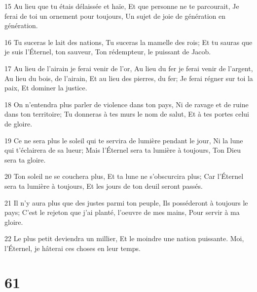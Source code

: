 \par 15 Au lieu que tu étais délaissée et haïe, Et que personne ne te parcourait, Je ferai de toi un ornement pour toujours, Un sujet de joie de génération en génération.
\par 16 Tu suceras le lait des nations, Tu suceras la mamelle des rois; Et tu sauras que je suis l'Éternel, ton sauveur, Ton rédempteur, le puissant de Jacob.
\par 17 Au lieu de l'airain je ferai venir de l'or, Au lieu du fer je ferai venir de l'argent, Au lieu du bois, de l'airain, Et au lieu des pierres, du fer; Je ferai régner sur toi la paix, Et dominer la justice.
\par 18 On n'entendra plus parler de violence dans ton pays, Ni de ravage et de ruine dans ton territoire; Tu donneras à tes murs le nom de salut, Et à tes portes celui de gloire.
\par 19 Ce ne sera plus le soleil qui te servira de lumière pendant le jour, Ni la lune qui t'éclairera de sa lueur; Mais l'Éternel sera ta lumière à toujours, Ton Dieu sera ta gloire.
\par 20 Ton soleil ne se couchera plus, Et ta lune ne s'obscurcira plus; Car l'Éternel sera ta lumière à toujours, Et les jours de ton deuil seront passés.
\par 21 Il n'y aura plus que des justes parmi ton peuple, Ils posséderont à toujours le pays; C'est le rejeton que j'ai planté, l'oeuvre de mes mains, Pour servir à ma gloire.
\par 22 Le plus petit deviendra un millier, Et le moindre une nation puissante. Moi, l'Éternel, je hâterai ces choses en leur temps.

\chapter{61}


